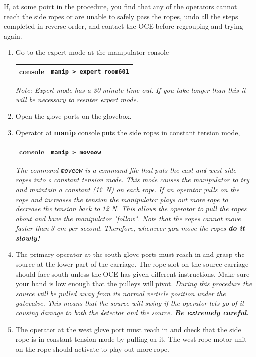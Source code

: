 \documentclass[11pt]{article}
\begin{document}
If, at some point in the procedure, you find that any of the operators cannot reach the side ropes or are unable to safely pass the ropes, undo all the steps completed in reverse order, and contact the OCE before regrouping and trying again. 
\begin{enumerate}
\item \CheckBox[name=aesr1]{} Go to the expert mode at the manipulator console
\begin{center}
\begin{tabular}{|c|c|}
\hline
console & \verb+manip > expert room601+\\
\hline
\end{tabular}
\end{center}
{\it Note: Expert mode has a 30 minute time out. If you take longer than this it will be necessary to reenter expert mode.}
\item \CheckBox[name=aesr2]{} Open the glove ports on the glovebox.
\item \CheckBox[name=aesr3]{} Operator at {\bf manip} console puts the side ropes in constant tension mode,
\begin{center}
\begin{tabular}{|c|c|}
\hline
console & \verb+manip > moveew+\\
\hline
\end{tabular}
\end{center}
{\it The command \verb+moveew+ is a command file that puts the east and west side ropes into a constant tension mode. This mode causes the manipulator to try and maintain a constant (12~N) on each rope. If an operator pulls on the rope and increases the tension the manipulator plays out more rope to decrease the tension back to 12 N. This allows the operator to pull the ropes about and have the manipulator "follow". Note that the ropes cannot move faster than 3 cm per second. Therefore, whenever you move the ropes {\bf do it slowly!}}
\item \CheckBox[name=aesr4]{} The primary operator at the south glove ports must reach in and grasp the source at the lower part of the carriage. The rope slot on the source carriage should face south unless the OCE has given different instructions. Make sure your hand is low enough that the pulleys will pivot. {\it During this procedure the source will be pulled away from its normal verticle position under the gatevalve. This means that the source will swing if the operator lets go of it causing damage to both the detector and the source. {\bf Be extremely careful.}}
\item \CheckBox[name=aesr5]{} The operator at the west glove port must reach in and check that the side rope is in constant tension mode by pulling on it. The west rope motor unit on the rope should activate to play out more rope.

\end{enumerate}
\end{document}
